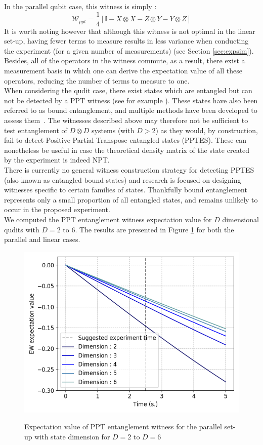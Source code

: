 \documentclass[%
 12pt,
 superscriptaddress,
 amsmath,
 amssymb,
 onecolumn,
 longbibliography
]{revtex4-2}
\begin{document}
In the parallel qubit case, this witness is simply \cite{Chevalier:2020uvv}:
		\begin{equation}
			\mathcal{W}_{ppt} = \frac{1}{4}[\mathbb{I} - X\otimes X - Z \otimes Y - Y \otimes Z]
		\end{equation} 
\indent It is worth noting however that although this witness is not optimal in the linear set-up, having fewer terms to measure results in less variance when conducting the experiment (for a given number of measurements) (see Section \ref{sec:expsim}). Besides, all of the operators in the witness commute, as a result, there exist a measurement basis in which one can derive the expectation value of all these operators, reducing the number of terms to measure to one. \\
\indent When considering the qudit case, there exist states which are entangled but can not be detected by a PPT witness (see for example \cite{Horodecki1997, Horodecki1999}). These states have also been referred to as bound entanglement, and multiple methods have been developed to assess them~\cite{Horodecki1998, Yu2005,Guhne2006, Chruscinski2007, Chruscinski2011, Rudolph2003}. The witnesses described above may therefore not be sufficient to test entanglement of $D\otimes D$ systems (with $D>2$) as they would, by construction, fail to detect Positive Partial Transpose entangled states (PPTES). These can nonetheless be useful in case the theoretical density matrix of the state created by the experiment is indeed NPT. \\
\indent There is currently no general witness construction strategy for detecting PPTES (also known as entangled bound states) and research is focused on designing witnesses specific to certain families of states. Thankfully bound entanglement represents only a small proportion of all entangled states, and remains unlikely to occur in the proposed experiment. \\
\indent We computed the PPT entanglement witness expectation value for $D$ dimensional qudits with $D=2$ to $6$. The results are presented in Figure \ref{fig:pptEW_qudit_para} for both the parallel and linear cases.\\
	\begin{figure}
        \includegraphics[width=.5\columnwidth]{EW_para_qudits.png}\par\medskip
		\caption{Expectation value of PPT entanglement witness for the parallel set-up with state dimension for $D=2$ to $D=6$}\par\medskip \label{fig:pptEW_qudit_para}
	\end{figure}
\end{document}
